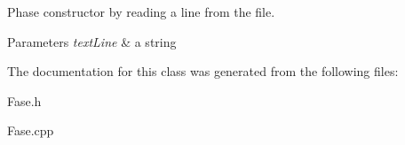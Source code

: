 Phase constructor by reading a line from the file. 


\begin{DoxyParams}{Parameters}
{\em text\+Line} & a string \\
\hline
\end{DoxyParams}


The documentation for this class was generated from the following files\+:\begin{DoxyCompactItemize}
\item 
Fase.\+h\item 
Fase.\+cpp\end{DoxyCompactItemize}
